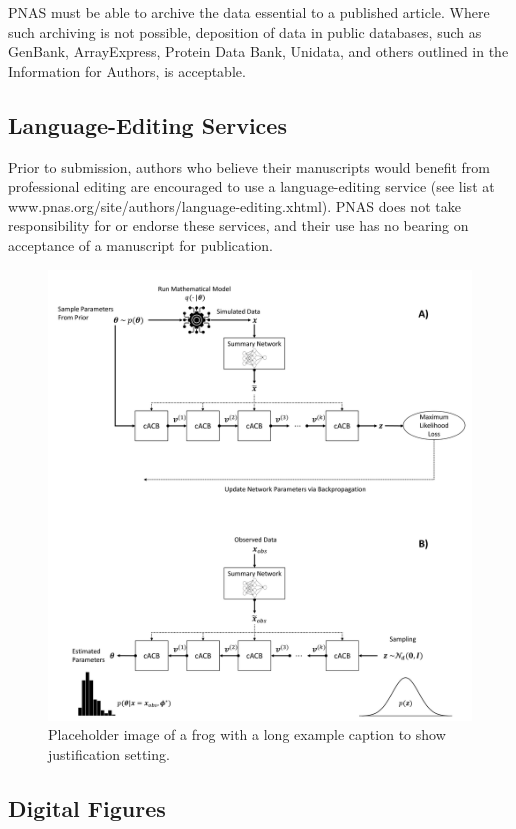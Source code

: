 \documentclass[9pt,twoside,lineno]{pnas-new}
\begin{document}
PNAS must be able to archive the data essential to a published article. Where such archiving is not possible, deposition of data in public databases, such as GenBank, ArrayExpress, Protein Data Bank, Unidata, and others outlined in the Information for Authors, is acceptable.

\subsection*{Language-Editing Services}
Prior to submission, authors who believe their manuscripts would benefit from professional editing are encouraged to use a language-editing service (see list at www.pnas.org/site/authors/language-editing.xhtml). PNAS does not take responsibility for or endorse these services, and their use has no bearing on acceptance of a manuscript for publication. 

\begin{figure}%
\centering
\includegraphics[scale=0.1]{figure1.png}
\caption{Placeholder image of a frog with a long example caption to show justification setting.}
\label{fig:frog}
\end{figure}


\subsection*{Digital Figures}
\end{document}
